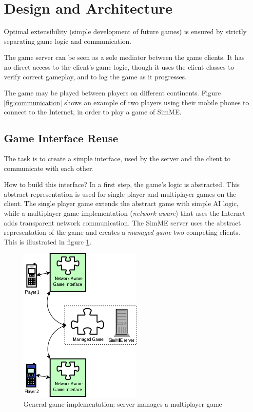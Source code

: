 \section{Design and Architecture} \label{sec:architecture}

	Optimal extensibility (simple development of future games) is ensured by
	strictly separating game logic and communication.

	The game server can be seen as a sole mediator between the game clients. It
	has no direct access to the client's game logic, though it uses the client
	classes to verify correct gameplay, and to log the game as it progresses.

	The game may be played between players on different continents. Figure
	\ref{fig:communication} shows an example of two players using their mobile
	phones to connect to the Internet, in order to play a game of SimME.

	\subsection{Game Interface Reuse} \label{sec:interface}

		The task is to create a simple interface, used by the server and the
		client to communicate with each other.

		How to build this interface? In a first step, the game's logic is
		abstracted. This abstract representation is used for single player and
		multiplayer games on the client. The single player game extends the
		abstract game with simple AI logic, while a multiplayer game
		implementation (\emph{network aware}) that uses the Internet adds
		transparent network communication. The SimME server uses the abstract
		representation of the game and creates a \emph{managed game} two
		competing clients. This is illustrated in figure \ref{fig:interface}.

		\begin{figure}[h]
		\begin{center}
			\includegraphics{pics/interface-usage.png}
			\caption{General game implementation: server manages a multiplayer game}
			\label{fig:interface}
		\end{center}
		\end{figure}

